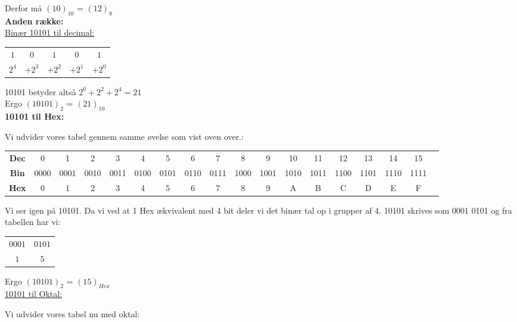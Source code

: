 Derfor må $(10)_{10}$ = $(12)_{8}$\\

\textbf{Anden række:}\\
\underline{Binær 10101 til decimal:\\}

\begin{table}[h]
	\centering
	\begin{tabular}{ccccc}
		$1$&$0$&$1$&$0$&$1$\\ 
		$2^4$&$+2^3$&$+2^2$&$+2^1$&$+2^0$\\ 
	\end{tabular}
\end{table}

10101 betyder altså $2^0 + 2^2 + 2^4 = 21$ \\

Ergo $(10101)_{2}$ = $(21)_{10}$\\

\textbf{10101 til Hex:}

Vi udvider vores tabel gennem samme øvelse som vist oven over.:
\begin{table}[!htbp]
	\setlength\tabcolsep{4pt}
	\begin{tabular}{|c|c|c|c|c|c|c|c|c|c|c|c|c|c|c|c|c|c|}
		\hline
		\textbf{Dec}&0&1&2&3&4&5&6&7&8&9&10&11&12&13&14&15\\ \cline{1-17}
		\textbf{Bin}&0000&0001&0010&0011&0100&0101&0110&0111&1000&1001&1010&1011&1100&1101&1110&1111\\ \cline{1-17}
		\textbf{Hex}&0&1&2&3&4&5&6&7&8&9&A&B&C&D&E&F\\ \cline{1-17}
	\end{tabular}
\end{table}

\clearpage
Vi ser igen på 10101. Da vi ved at 1 Hex ækvivalent med 4 bit deler vi det binær tal op i grupper af 4. 10101 skrives som 0001 0101 og fra tabellen har vi:
\begin{table}[h]
	\centering
	\begin{tabular}{cc}
		$0001$&$0101$\\ 
		$1$&$5$\\ 
	\end{tabular}
\end{table}

Ergo $(10101)_{2}$ = $(15)_{Hex}$\\

\underline{10101 til Oktal:}

Vi udvider vores tabel nu med oktal:


